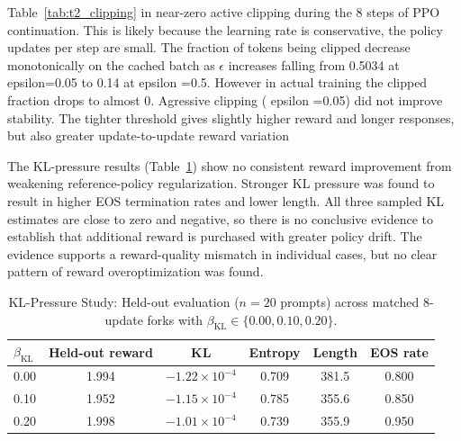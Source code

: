 \documentclass{article}
\begin{document}
\begin{table}[!htbp]
    \centering
    \caption{Clipping Study: Cached rollout batch diagnostics and matched 8-update fork evaluations ($n=20$ held-out prompts) across $\epsilon \in \{0.05, 0.20, 0.50\}$.}
    \label{tab:t2_clipping}
    \small
\end{table}

Table~\ref{tab:t2_clipping} in near-zero active clipping during the 8 steps of PPO continuation. This is likely  because the learning rate is conservative, the policy updates per step are small. The fraction of tokens being clipped decrease monotonically on the cached batch as $\epsilon$ increases falling from 0.5034 at epsilon=0.05 to 0.14  at epsilon =0.5. However in actual training the clipped fraction drops to almost 0. Agressive clipping ( epsilon =0.05) did not improve stability. The tighter threshold gives slightly higher reward and longer responses, but also greater update-to-update reward variation

The KL-pressure results (Table~\ref{tab:t2_kl}) show no consistent reward improvement from weakening reference-policy regularization. Stronger KL pressure was found to result in higher EOS termination rates and lower length. All three sampled KL estimates are close to zero and negative, so there is no conclusive evidence to establish that additional reward is purchased with greater policy drift. The evidence supports a reward-quality mismatch in individual cases, but  no  clear pattern  of reward overoptimization was found.
\begin{table}[!htbp]
    \centering
    \caption{KL-Pressure Study: Held-out evaluation ($n=20$ prompts) across matched 8-update forks with $\beta_{\text{KL}} \in \{0.00, 0.10, 0.20\}$.}
    \label{tab:t2_kl}
    \small
    \begin{tabular}{lccccc}
        \toprule
        $\beta_{\text{KL}}$ & Held-out reward & KL & Entropy & Length & EOS rate \\
        \midrule
        0.00 & 1.994 & $-1.22\times10^{-4}$ & 0.709 & 381.5 & 0.800 \\
        0.10 & 1.952 & $-1.15\times10^{-4}$ & 0.785 & 355.6 & 0.850 \\
        0.20 & 1.998 & $-1.01\times10^{-4}$ & 0.739 & 355.9 & 0.950 \\
        \bottomrule
    \end{tabular}
\end{table}
\end{document}
